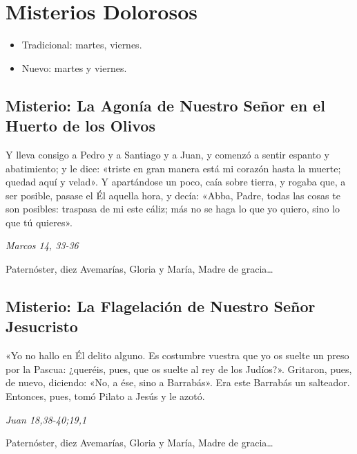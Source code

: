 \documentclass[./rosary.tex]{subfiles}
\newcounter{sorrowful-counter}
\begin{document}
\section*{Misterios Dolorosos}
\begin{itemize}
      \item Tradicional: martes, viernes.
      \item Nuevo: martes y viernes.
\end{itemize}

\subsection*{ Misterio: La Agonía de Nuestro Señor en el Huerto de los Olivos}

Y lleva consigo a Pedro y a Santiago y a Juan, y comenzó a sentir espanto y abatimiento; y le dice:
«triste en gran manera está mi corazón hasta la muerte; quedad aquí y velad». Y apartándose un poco,
caía sobre tierra, y rogaba que, a ser posible, pasase el Él aquella hora, y decía: «Abba, Padre, todas las cosas te son posibles:
traspasa de mi este cáliz; más no se haga lo que yo quiero, sino lo que tú quieres».

\begin{flushright}
      \emph{Marcos 14, 33-36}
\end{flushright}

Paternóster, diez Avemarías, Gloria y María, Madre de gracia{\ldots}

\bigskip

\subsection*{ Misterio: La Flagelación de Nuestro Señor Jesucristo}

«Yo no hallo en Él delito alguno. Es costumbre vuestra que yo os suelte un preso por la Pascua:
¿queréis, pues, que os suelte al rey de los Judíos?». Gritaron, pues, de nuevo, diciendo: «No, a ése, sino a Barrabás».
Era este Barrabás un salteador. Entonces, pues, tomó Pilato a Jesús y le azotó.

\begin{flushright}
      \emph{Juan 18,38-40;19,1}
\end{flushright}

Paternóster, diez Avemarías, Gloria y María, Madre de gracia{\ldots}
\end{document}
